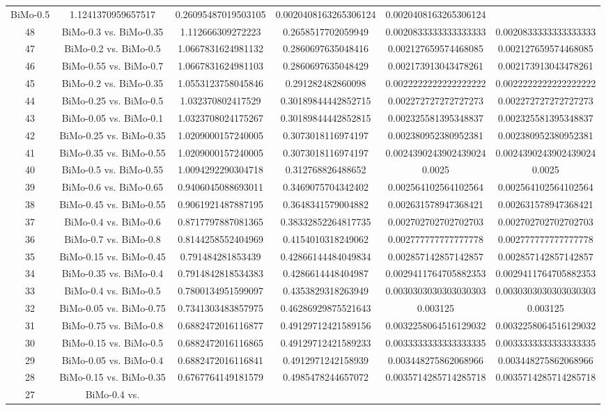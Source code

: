 \documentclass[a4paper,10pt]{article}
\begin{document}
\begin{landscape}
\begin{table}[!htp]
\begin{tabular}{cccccc}
BiMo-0.5&1.1241370959657517&0.26095487019503105&0.0020408163265306124&0.0020408163265306124\\48&BiMo-0.3 vs. BiMo-0.35&1.112666309272223&0.2658517702059949&0.0020833333333333333&0.0020833333333333333\\47&BiMo-0.2 vs. BiMo-0.5&1.0667831624981132&0.2860697635048416&0.002127659574468085&0.002127659574468085\\46&BiMo-0.55 vs. BiMo-0.7&1.0667831624981103&0.2860697635048429&0.002173913043478261&0.002173913043478261\\45&BiMo-0.2 vs. BiMo-0.35&1.0553123758045846&0.291282482860098&0.0022222222222222222&0.0022222222222222222\\44&BiMo-0.25 vs. BiMo-0.5&1.032370802417529&0.30189844442852715&0.002272727272727273&0.002272727272727273\\43&BiMo-0.05 vs. BiMo-0.1&1.0323708024175267&0.30189844442852815&0.002325581395348837&0.002325581395348837\\42&BiMo-0.25 vs. BiMo-0.35&1.0209000157240005&0.3073018116974197&0.002380952380952381&0.002380952380952381\\41&BiMo-0.35 vs. BiMo-0.55&1.0209000157240005&0.3073018116974197&0.0024390243902439024&0.0024390243902439024\\40&BiMo-0.5 vs. BiMo-0.55&1.0094292290304718&0.312768826488652&0.0025&0.0025\\39&BiMo-0.6 vs. BiMo-0.65&0.9406045088693011&0.3469075704342402&0.002564102564102564&0.002564102564102564\\38&BiMo-0.45 vs. BiMo-0.55&0.9061921487887195&0.3648341579004882&0.002631578947368421&0.002631578947368421\\37&BiMo-0.4 vs. BiMo-0.6&0.8717797887081365&0.38332852264817735&0.002702702702702703&0.002702702702702703\\36&BiMo-0.7 vs. BiMo-0.8&0.8144258552404969&0.4154010318249062&0.002777777777777778&0.002777777777777778\\35&BiMo-0.15 vs. BiMo-0.45&0.791484281853439&0.42866144484049834&0.002857142857142857&0.002857142857142857\\34&BiMo-0.35 vs. BiMo-0.4&0.7914842818534383&0.4286614448404987&0.0029411764705882353&0.0029411764705882353\\33&BiMo-0.4 vs. BiMo-0.5&0.7800134951599097&0.4353829318263949&0.0030303030303030303&0.0030303030303030303\\32&BiMo-0.05 vs. BiMo-0.75&0.7341303483857975&0.46286929875521643&0.003125&0.003125\\31&BiMo-0.75 vs. BiMo-0.8&0.6882472016116877&0.49129712421589156&0.0032258064516129032&0.0032258064516129032\\30&BiMo-0.15 vs. BiMo-0.5&0.6882472016116865&0.49129712421589233&0.0033333333333333335&0.0033333333333333335\\29&BiMo-0.05 vs. BiMo-0.4&0.6882472016116841&0.4912971242158939&0.003448275862068966&0.003448275862068966\\28&BiMo-0.15 vs. BiMo-0.35&0.6767764149181579&0.4985478244657072&0.0035714285714285718&0.0035714285714285718\\27&BiMo-0.4 vs. 
\end{tabular}
\end{table}
\end{landscape}
\end{document}
